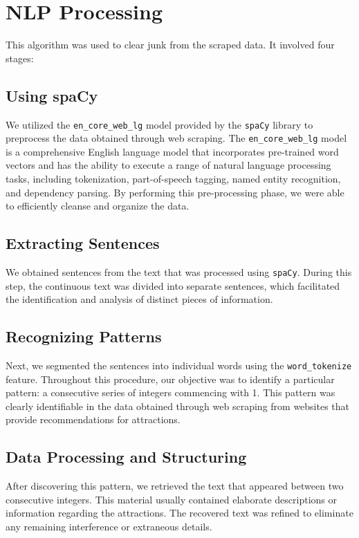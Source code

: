 \documentclass[conference]{IEEEtran}
\begin{document}
\section{NLP Processing}

    This algorithm was used to clear junk from the scraped data. It involved four stages:

    \subsection{Using spaCy}
        We utilized the \texttt{en\_core\_web\_lg} model provided by the \texttt{spaCy} library to preprocess the data obtained through web scraping. The \texttt{en\_core\_web\_lg} model is a comprehensive English language model that incorporates pre-trained word vectors and has the ability to execute a range of natural language processing tasks, including tokenization, part-of-speech tagging, named entity recognition, and dependency parsing. By performing this pre-processing phase, we were able to efficiently cleanse and organize the data.

    \subsection{Extracting Sentences}
        We obtained sentences from the text that was processed using \texttt{spaCy}. During this step, the continuous text was divided into separate sentences, which facilitated the identification and analysis of distinct pieces of information.

    \subsection{Recognizing Patterns}
        Next, we segmented the sentences into individual words using the \texttt{word\_tokenize} feature. Throughout this procedure, our objective was to identify a particular pattern: a consecutive series of integers commencing with 1. This pattern was clearly identifiable in the data obtained through web scraping from websites that provide recommendations for attractions.

    \subsection{Data Processing and Structuring}
        After discovering this pattern, we retrieved the text that appeared between two consecutive integers. This material usually contained elaborate descriptions or information regarding the attractions. The recovered text was refined to eliminate any remaining interference or extraneous details.
\end{document}
